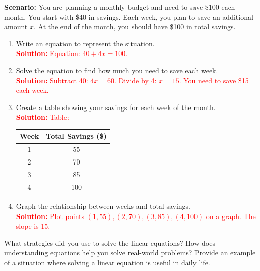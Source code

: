 \documentclass[11pt]{article}
\begin{document}
\vspace{1em}

\begin{tcolorbox}[colframe=black!60, colback=white, 
coltitle=black, colbacktitle=black!15, fonttitle=\bfseries\Large, 
title=Performance Task: Budget Planning, halign title=center, left=10pt, right=10pt, top=10pt, bottom=50pt]
\textbf{Scenario:} You are planning a monthly budget and need to save \$100 each month. You start with \$40 in savings. Each week, you plan to save an additional amount \(x\). At the end of the month, you should have \$100 in total savings.
\begin{enumerate}[itemsep=2em]
    \item Write an equation to represent the situation.\\
    \textcolor{red}{\textbf{Solution:} Equation: \(40 + 4x = 100\).}

    \item Solve the equation to find how much you need to save each week.\\
    \textcolor{red}{\textbf{Solution:} Subtract 40: \(4x = 60\). Divide by 4: \(x = 15\). You need to save \$15 each week.}

    \item Create a table showing your savings for each week of the month.\\
    \textcolor{red}{\textbf{Solution:} Table:}
    \begin{center}
    \begin{tabular}{|c|c|}
    \hline
    Week & Total Savings (\$) \\ \hline
    1 & 55 \\ \hline
    2 & 70 \\ \hline
    3 & 85 \\ \hline
    4 & 100 \\ \hline
    \end{tabular}
    \end{center}

    \item Graph the relationship between weeks and total savings.\\
    \textcolor{red}{\textbf{Solution:} Plot points \((1, 55), (2, 70), (3, 85), (4, 100)\) on a graph. The slope is 15.}
\end{enumerate}
\end{tcolorbox}

\vspace{1em}

\begin{tcolorbox}[colframe=black!60, colback=white, 
coltitle=black, colbacktitle=black!15, fonttitle=\bfseries\Large, 
title=Reflection, halign title=center, left=10pt, right=10pt, top=10pt, bottom=80pt]
What strategies did you use to solve the linear equations? How does understanding equations help you solve real-world problems? Provide an example of a situation where solving a linear equation is useful in daily life.
\end{tcolorbox}
\end{document}
